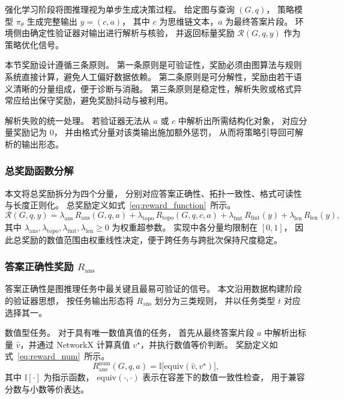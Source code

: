 强化学习阶段将图推理视为单步生成决策过程。
给定图与查询 $(G,q)$，
策略模型 $\pi_\theta$ 生成完整输出 $y=(c,a)$，
其中 $c$ 为思维链文本，$a$ 为最终答案片段。
环境侧由确定性验证器对输出进行解析与核验，
并返回标量奖励 $\mathcal{R}(G,q,y)$ 作为策略优化信号。

本节奖励设计遵循三条原则。
第一条原则是可验证性，奖励必须由图算法与规则系统直接计算，避免人工偏好数据依赖。
第二条原则是可分解性，奖励由若干语义清晰的分量组成，便于诊断与消融。
第三条原则是稳定性，解析失败或格式异常应给出保守奖励，避免奖励抖动与被利用。

{解析失败的统一处理。}
若验证器无法从 $a$ 或 $c$ 中解析出所需结构化对象，
对应分量奖励记为 $0$，
并由格式分量对该类输出施加额外惩罚，
从而将策略引导回可解析的输出形态。

\subsubsection{总奖励函数分解}
\label{subsubsec:reward_decompose}

本文将总奖励拆分为四个分量，
分别对应答案正确性、拓扑一致性、格式可读性与长度正则化。
总奖励定义如式~\ref{eq:reward_function}\ 所示。
\begin{equation}
  \mathcal{R}(G,q,y)
  =
  \lambda_{\mathrm{ans}} \, R_{\mathrm{ans}}(G,q,a)
  +
  \lambda_{\mathrm{topo}} \, R_{\mathrm{topo}}(G,q,c,a)
  +
  \lambda_{\mathrm{fmt}} \, R_{\mathrm{fmt}}(y)
  +
  \lambda_{\mathrm{len}} \, R_{\mathrm{len}}(y),
  \label{eq:reward_function}
\end{equation}
其中 $\lambda_{\mathrm{ans}},\lambda_{\mathrm{topo}},\lambda_{\mathrm{fmt}},\lambda_{\mathrm{len}} \ge 0$ 为权重超参数。
实现中各分量均限制在 $[0,1]$，
因此总奖励的数值范围由权重线性决定，便于跨任务与跨批次保持尺度稳定。

\subsubsection{答案正确性奖励 $R_{\mathrm{ans}}$}
\label{subsubsec:reward_ans}

答案正确性是图推理任务中最关键且最易可验证的信号。
本文沿用数据构建阶段的验证器思想，
按任务输出形态将 $R_{\mathrm{ans}}$ 划分为三类规则，
并以任务类型 $t$ 对应选择其一。

{数值型任务。}
对于具有唯一数值真值的任务，
首先从最终答案片段 \(a\) 中解析出标量
\(\hat{v}\)，并通过 NetworkX\cite{Rossi2015TheND} 计算真值
\(v^\star\)，并执行数值等价判断。
奖励定义如式~\ref{eq:reward_num}\ 所示。
\begin{equation}
  R_{\mathrm{ans}}^{\mathrm{num}}(G,q,a)
  =
  \mathbb{I}\big[\mathrm{equiv}(\hat{v}, v^\star)\big],
  \label{eq:reward_num}
\end{equation}
其中 \(\mathbb{I}[\cdot]\) 为指示函数，
$\mathrm{equiv}(\cdot,\cdot)$ 表示在容差下的数值一致性检查，
用于兼容分数与小数等价表达。

